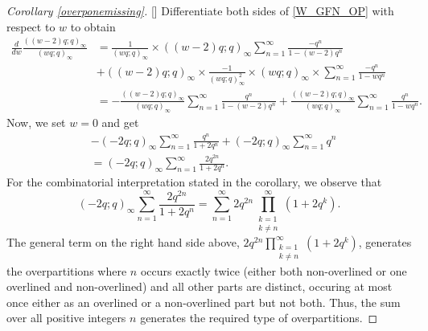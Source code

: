 \documentclass[10pt,a4paper]{amsart}
\begin{document}
\begin{proof}[Corollary \textup{\ref{overponemissing}}][]
Differentiate both sides of \eqref{W_GFN_OP} with respect to $w$ to obtain
\begin{align*}
\frac{d}{dw} \frac{((w-2)q; q)_{\infty}}{(wq; q)_{\infty}}&= \frac{1}{(wq; q)_{\infty}} \times ((w-2)q; q)_{\infty} \sum_{n=1}^{\infty}\frac{-q^n}{1 - (w-2) q^n} \\
&+ ((w-2)q; q)_{\infty} \times \frac{-1}{(wq; q)_{\infty}^2} \times (wq; q)_{\infty} \times \sum_{n=1}^{\infty} \frac{-q^n}{1 - wq^n} \\
&= -\frac{((w-2)q; q)_{\infty}}{(wq; q)_{\infty}}\sum_{n=1}^{\infty}\frac{q^n}{1 - (w-2) q^n} + \frac{((w-2)q; q)_{\infty}}{(wq; q)_{\infty}} \sum_{n=1}^{\infty} \frac{q^n}{1 - wq^n}.
\end{align*}
Now, we set $w=0$ and get
\begin{align*}
&-(-2q; q)_{\infty}\sum_{n=1}^{\infty} \frac{q^n}{1 + 2q^n} + (-2q; q)_{\infty}\sum_{n=1}^{\infty}q^n \\
&  = (-2q; q)_{\infty}\sum_{n=1}^{\infty}\frac{2q^{2n}}{1 + 2q^n}.
\end{align*}
For the combinatorial interpretation stated in the corollary, we observe that
\begin{equation*}
(-2q; q)_{\infty}\sum_{n=1}^{\infty}\frac{2q^{2n}}{1 + 2q^n} = \sum_{n=1}^{\infty} 2q^{2n} \prod_{\substack{k=1 \\ k \neq n}}^{\infty} (1+2q^k).
\end{equation*}
The general term on the right hand side above, $2q^{2n} \prod_{\substack{k=1 \\ k \neq n}}^{\infty} (1+2q^k)$, generates the overpartitions where $n$ occurs exactly twice (either both non-overlined or one overlined and non-overlined) and all other parts are distinct, occuring at most once either as an overlined or a non-overlined part but not both. Thus, the sum over all positive integers $n$ generates the required type of overpartitions.
\end{proof}
\end{document}
